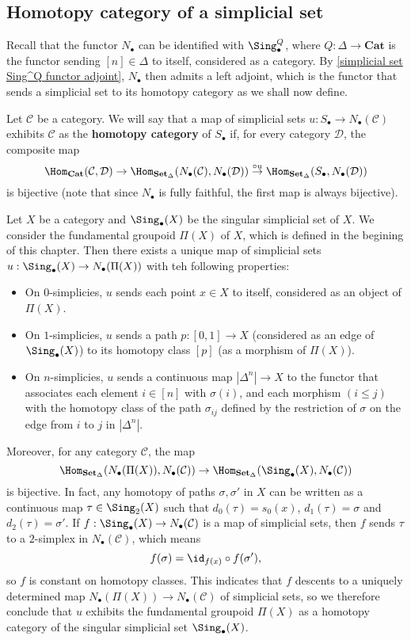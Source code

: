 \subsection{Homotopy category of a simplicial set}
Recall that the functor $N_\bullet$ can be identified with $\Sing_\bullet^Q$, where $Q:\Delta\to\mathbf{Cat}$ is the functor sending $[n]\in\Delta$ to itself, considered as a category. By \cref{simplicial set Sing^Q functor adjoint}, $N_\bullet$ then admits a left adjoint, which is the functor that sends a simplicial set to its homotopy category as we shall now define.\par
Let $\mathcal{C}$ be a category. We will say that a map of simplicial sets $u:S_\bullet\to N_\bullet(\mathcal{C})$ exhibits $\mathcal{C}$ as the \textbf{homotopy category} of $S_\bullet$ if, for every category $\mathcal{D}$, the composite map
\[\Hom_{\mathbf{Cat}}(\mathcal{C},\mathcal{D})\to\Hom_{\mathbf{Set}_\Delta}(N_\bullet(\mathcal{C}),N_\bullet(\mathcal{D}))\stackrel{\circ u}{\to}\Hom_{\mathbf{Set}_\Delta}(S_\bullet,N_\bullet(\mathcal{D}))\]
is bijective (note that since $N_\bullet$ is fully faithful, the first map is always bijective).
\begin{example}\label{simplicial set Sing(X) homotopy cat is Pi(X)}
Let $X$ be a category and $\Sing_\bullet(X)$ be the singular simplicial set of $X$. We consider the fundamental groupoid $\Pi(X)$ of $X$, which is defined in the begining of this chapter. Then there exists a unique map of simplicial sets $u:\Sing_\bullet(X)\to N_\bullet(\Pi(X))$ with teh following properties:
\begin{itemize}
\item On $0$-simplicies, $u$ sends each point $x\in X$ to itself, considered as an object of $\Pi(X)$.
\item On $1$-simplicies, $u$ sends a path $p:[0,1]\to X$ (considered as an edge of $\Sing_\bullet(X)$) to its homotopy class $[p]$ (as a morphism of $\Pi(X)$).
\item On $n$-simplicies, $u$ sends a continuous map $|\Delta^n|\to X$ to the functor that associates each element $i\in[n]$ with $\sigma(i)$, and each morphism $(i\leq j)$ with the homotopy class of the path $\sigma_{ij}$ defined by the restriction of $\sigma$ on the edge from $i$ to $j$ in $|\Delta^n|$.
\end{itemize}
Moreover, for any category $\mathcal{C}$, the map
\[\Hom_{\mathbf{Set}_\Delta}(N_\bullet(\Pi(X)),N_\bullet(\mathcal{C}))\to\Hom_{\mathbf{Set}_\Delta}(\Sing_\bullet(X),N_\bullet(\mathcal{C}))\]
is bijective. In fact, any homotopy of paths $\sigma,\sigma'$ in $X$ can be written as a continuous map $\tau\in\Sing_2(X)$ such that $d_0(\tau)=s_0(x)$, $d_1(\tau)=\sigma$ and $d_2(\tau)=\sigma'$. If $f:\Sing_\bullet(X)\to N_\bullet(\mathcal{C})$ is a map of simplicial sets, then $f$ sends $\tau$ to a $2$-simplex in $N_\bullet(\mathcal{C})$, which means
\[f(\sigma)=\id_{f(x)}\circ f(\sigma'),\]
so $f$ is constant on homotopy classes. This indicates that $f$ descents to a uniquely determined map $N_\bullet(\Pi(X))\to N_\bullet(\mathcal{C})$ of simplicial sets, so we therefore conclude that $u$ exhibits the fundamental groupoid $\Pi(X)$ as a homotopy category of the singular simplicial set $\Sing_\bullet(X)$.
\end{example}
